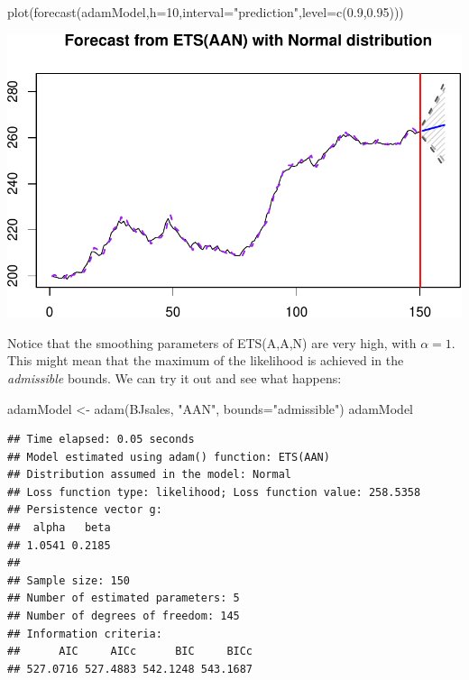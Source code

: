\documentclass[
]{book}
\newenvironment{Shaded}{\begin{snugshade}}{\end{snugshade}}
\newcommand{\AttributeTok}[1]{\textcolor[rgb]{0.77,0.63,0.00}{#1}}
\newcommand{\DecValTok}[1]{\textcolor[rgb]{0.00,0.00,0.81}{#1}}
\newcommand{\FloatTok}[1]{\textcolor[rgb]{0.00,0.00,0.81}{#1}}
\newcommand{\FunctionTok}[1]{\textcolor[rgb]{0.00,0.00,0.00}{#1}}
\newcommand{\NormalTok}[1]{#1}
\newcommand{\OtherTok}[1]{\textcolor[rgb]{0.56,0.35,0.01}{#1}}
\newcommand{\StringTok}[1]{\textcolor[rgb]{0.31,0.60,0.02}{#1}}
\theoremstyle{definition}
\theoremstyle{definition}
\theoremstyle{definition}
\theoremstyle{definition}
\theoremstyle{remark}
\begin{document}
\begin{Shaded}
\begin{Highlighting}[]
\FunctionTok{plot}\NormalTok{(}\FunctionTok{forecast}\NormalTok{(adamModel,}\AttributeTok{h=}\DecValTok{10}\NormalTok{,}\AttributeTok{interval=}\StringTok{"prediction"}\NormalTok{,}\AttributeTok{level=}\FunctionTok{c}\NormalTok{(}\FloatTok{0.9}\NormalTok{,}\FloatTok{0.95}\NormalTok{)))}
\end{Highlighting}
\end{Shaded}

\includegraphics{adam_files/figure-latex/unnamed-chunk-27-1.pdf}

Notice that the smoothing parameters of ETS(A,A,N) are very high, with \(\alpha=1\). This might mean that the maximum of the likelihood is achieved in the \emph{admissible} bounds. We can try it out and see what happens:

\begin{Shaded}
\begin{Highlighting}[]
\NormalTok{adamModel }\OtherTok{\textless{}{-}} \FunctionTok{adam}\NormalTok{(BJsales, }\StringTok{"AAN"}\NormalTok{, }\AttributeTok{bounds=}\StringTok{"admissible"}\NormalTok{)}
\NormalTok{adamModel}
\end{Highlighting}
\end{Shaded}

\begin{verbatim}
## Time elapsed: 0.05 seconds
## Model estimated using adam() function: ETS(AAN)
## Distribution assumed in the model: Normal
## Loss function type: likelihood; Loss function value: 258.5358
## Persistence vector g:
##  alpha   beta 
## 1.0541 0.2185 
## 
## Sample size: 150
## Number of estimated parameters: 5
## Number of degrees of freedom: 145
## Information criteria:
##      AIC     AICc      BIC     BICc 
## 527.0716 527.4883 542.1248 543.1687
\end{verbatim}
\end{document}
